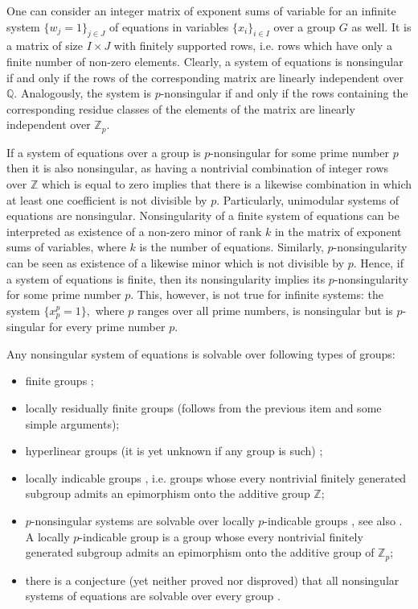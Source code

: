 \documentclass{article}
\theoremstyle{definition}
\theoremstyle{remark}
\begin{document}
One can consider an integer matrix
of exponent sums of variable for
an infinite system $\{w_j = 1\}_{j \in J}$ of equations
in variables $\{x_i\}_{i \in I}$ over a group $G$ as well.
It is a matrix of size $I \times J$
with finitely supported rows,
i.e. rows which have only a finite number
of non-zero elements.
Clearly, a system of equations is nonsingular
if and only if the rows of the corresponding matrix
are linearly independent over $\mathbb Q$.
Analogously, the system is $p$-nonsingular
if and only if the rows containing the corresponding
residue classes of the elements of the matrix
are linearly independent over $\mathbb Z_p$.

If a system of equations over a group is $p$-nonsingular
for some prime number $p$
then it is also nonsingular,
as having a nontrivial combination
of integer rows over $\mathbb Z$
which is equal to zero implies that there is
a likewise combination in which
at least one coefficient is not divisible by $p$.
Particularly, unimodular systems of equations are nonsingular.
Nonsingularity of a finite system of equations
can be interpreted as existence of a non-zero
minor of rank $k$ in the matrix of
exponent sums of variables, where $k$ is the number of equations.
Similarly, $p$-nonsingularity can be seen
as existence of a likewise minor which is not divisible by $p$.
Hence, if a system of equations is finite, then
its nonsingularity implies its $p$-nonsingularity for some prime
number $p$.
This, however, is not true for infinite systems:
the system
$
\{x_p^p=1\},
$
where $p$ ranges over all prime numbers,
is nonsingular but is $p$-singular
for every prime number $p$.

Any nonsingular system of equations is solvable over
following types of groups:
\begin{itemize}
\item finite groups \cite{GR62};
\item locally residually finite groups
(follows from the previous item and some simple arguments);
\item hyperlinear groups (it is yet unknown if any group is such) \cite{P08};
\item locally indicable groups \cite{How81},
i.e. groups whose every nontrivial
finitely generated subgroup
admits an epimorphism onto the additive group $\mathbb Z$;
\item $p$-nonsingular systems are solvable over
locally $p$-indicable groups \cite{G83},
see also \cite{Kr85}.
A locally $p$-indicable group is a group whose every nontrivial
finitely generated subgroup
admits an epimorphism onto the additive group of $\mathbb Z_p$;
\item there is a conjecture (yet neither proved nor disproved)
that all nonsingular systems of equations
are solvable over every group \cite{How81}.
\end{itemize}
\end{document}

